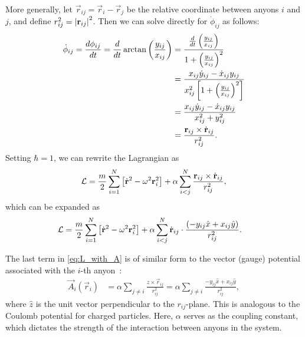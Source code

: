 More generally, let $\vec{r}_{ij} = \vec{r}_i - \vec{r}_j$ be the relative coordinate between anyons $i$ and $j$, and define $r_{ij}^2 = \left|{\mathbf{r}_{ij}}\right|^2$. Then we can solve directly for $\dot{\phi}_{ij}$ as follows:
\begin{align}
    \begin{split}        
    \dot{\phi}_{ij} = \frac{d\phi_{ij}}{dt} = \frac{d}{dt}\arctan\left( \frac{y_{ij}}{x_{ij}} \right)
        &= \frac{\frac{d}{dt}\left( \frac{y_{ij}}{x_{ij}} \right)}{1+{\left( \frac{y_{ij}}{x_{ij}} \right)}^2} \\
        &= \frac{x_{ij}\dot{y}_{ij} - \dot{x}_{ij}y_{ij}}{x_{ij}^2\left[ 1+{\left( \frac{y_{ij}}{x_{ij}} \right)}^2 \right]} \\
        &= \frac{x_{ij}\dot{y}_{ij} - \dot{x}_{ij}y_{ij}}{x_{ij}^2 + y_{ij}^2} \\
        &= \frac{\mathbf{r}_{ij}\times\dot{\mathbf{r}}_{ij}}{r_{ij}^2}.
    \end{split}
\end{align}
Setting $\hbar=1$, we can rewrite the Lagrangian as~\cite{Date2003}
\begin{equation}
    \mathcal{L} = \frac{m}{2}\sum_{i=1}^{N}\left[ \dot{\mathbf{r}}^{2} - \omega^2\mathbf{r}_i^{2} \right] + \alpha\sum_{i<j}^{N}\frac{\mathbf{r}_{ij}\times\dot{\mathbf{r}}_{ij}}{{r}_{ij}^{2}},\label{eq:compact_L}
\end{equation}
which can be expanded as
\begin{align}
    \mathcal{L} &= \frac{m}{2}\sum_{i=1}^{N}\left[ \dot{\mathbf{r}}^{2} - \omega^2\mathbf{r}_i^{2} \right] + \alpha\sum_{i<j}^{N}\dot{\mathbf{r}}_{ij}\cdot\frac{\left( -y_{ij}\hat{x} + x_{ij}\hat{y} \right)}{r_{ij}^2}.\label{eq:L_with_A}
\end{align}



The last term in \cref{eq:L_with_A} is of similar form to the vector (gauge) potential associated with the $i$-th anyon~\cite{Khare2005,Date2003,Moriyasu1983}:
\begin{align}
    \vec{A}_i(\vec{r}_i) &= \alpha\sum_{j\neq i}\frac{\hat{z}\times \vec{r}_{ij}}{r_{ij}^2} = \alpha\sum_{j\neq i}\frac{-y_{ij}\hat{x} + x_{ij}\hat{y}}{r_{ij}^2}, \label{eq:gauge}
\end{align}
where $\hat{z}$ is the unit vector perpendicular to the $r_{ij}$-plane. This is analogous to the Coulomb potential for charged particles. Here, $\alpha$ serves as the coupling constant, which dictates the strength of the interaction between anyons in the system.

